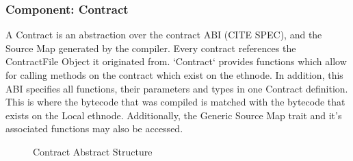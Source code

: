 \documentclass{report}
\begin{document}
    \subsubsection{Component: Contract}
        A Contract is an abstraction over the \Gls{contract} ABI (CITE SPEC), and the Source Map generated by the compiler. Every contract references the ContractFile Object it originated from. `Contract` provides functions which allow for calling methods on the contract which exist on the \Gls{ethnode}. In addition, this ABI specifies all functions, their parameters and types in one Contract definition. This is where the bytecode that was compiled is matched with the bytecode that exists on the Local \Gls{ethnode}. Additionally, the Generic Source Map trait and it's associated functions may also be accessed.
    \begin{figure}[!h]
        \caption{Contract Abstract Structure}
    \end{figure}
\end{document}
